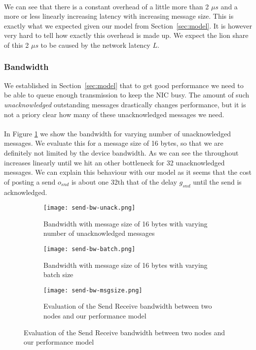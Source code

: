 \paragraph{} We can see that there is a constant overhead of a little more than 2 $\mu s$ and a more or less linearly 
increasing latency with increasing message size. This is exactly what we expected given our model from 
Section~\ref{sec:model}. It is however very hard to tell how exactly this overhead is made up. We expect the lion share
of this 2 $\mu s$ to be caused by the network latency $L$.



\subsubsection{Bandwidth}

We established in Section~\ref{sec:model} that to get good performance we need to be able to queue enough transmission
to keep the NIC busy. The amount of such \emph{unacknowledged} outstanding messages drastically changes performance, 
but it is not a priory clear how many of these unacknowledged messages we need. 

\paragraph{} In Figure \ref{fig:plot-sndrcv-bw-unack} we show the bandwidth for varying number of unacknowledged
messages. We evaluate this for a message size of 16 bytes, so that we are definitely not limited by the device bandwidth.
As we can see the throughout increases 
linearly until we hit an other bottleneck for 32 unacknowledged messages. We can explain this behaviour with our model
as it seems that the cost of posting a send $o_{snd}$ is about one 32th that of the delay $g_{snd}$ until the send is 
acknowledged.


\begin{figure}[]
\begin{subfigure}[b]{0.49\textwidth}
  \centering
  \texttt{[image: send-bw-unack.png]}
  \caption{Bandwidth with message size of 16 bytes with varying number of unacknowledged messages}
  \label{fig:plot-sndrcv-bw-unack}
\end{subfigure}
\begin{subfigure}[b]{0.49\textwidth}
  \centering
  \texttt{[image: send-bw-batch.png]}
  \caption{Bandwidth with message size of 16 bytes with varying batch size}
  \label{fig:plot-sndrcv-bw-batch}
\end{subfigure}
\begin{subfigure}[b]{1\textwidth}
  \centering
  \texttt{[image: send-bw-msgsize.png]}
  \caption{Evaluation of the Send Receive bandwidth between two nodes and our performance model}
  \label{fig:plot-sndrcv-bw}
\end{subfigure}
\end{figure}


